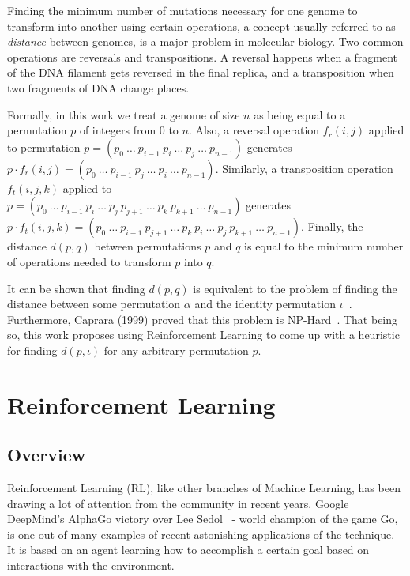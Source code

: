 \documentclass[11pt,twoside]{article}
\begin{document}
Finding the minimum number of mutations necessary for one genome to transform into another using certain operations, a concept usually referred to as \textit{distance} between genomes, is a major problem in molecular biology. Two common operations are reversals and transpositions. A reversal happens when a fragment of the DNA filament gets reversed in the final replica, and a transposition when two fragments of DNA change places. 

Formally, in this work we treat a genome of size $n$ as being equal to a permutation $p$ of integers from $0$ to $n$. Also, a reversal operation $f_r(i,j)$ applied to permutation $p = (p_0\ \ldots\ p_{i-1}\ p_{i}\ \ldots\ p_{j}\ \ldots\ p_{n-1})$ generates $p \cdot f_r(i,j) = (p_0\ \ldots\ p_{i-1}\ p_{j}\ \ldots\ p_{i}\ \ldots\ p_{n-1})$. Similarly, a transposition operation $f_t(i,j,k)$ applied to\\ $p = (p_0\ \ldots\ p_{i-1}\ p_{i}\ \ldots\ p_{j}\ p_{j+1}\ \ldots\ p_{k}\ p_{k+1}\ \ldots\ p_{n-1})$ generates\\ $p \cdot f_t(i,j,k) = (p_0\ \ldots\ p_{i-1}\ p_{j+1}\ \ldots\ p_{k}\ p_{i}\ \ldots\ p_{j}\ p_{k+1}\ \ldots\ p_{n-1})$. Finally, the distance $d(p, q)$ between permutations $p$ and $q$ is equal to the minimum number of operations needed to transform $p$ into $q$.

It can be shown that finding $d(p, q)$ is equivalent to the problem of finding the distance between some permutation $\alpha$ and the identity permutation $\iota$~\cite{flavio}. Furthermore, Caprara (1999) proved that this problem is NP-Hard~\cite{caprara1999sorting}. That being so, this work proposes using Reinforcement Learning to come up with a heuristic for finding $d(p, \iota)$ for any arbitrary permutation $p$.

\section{Reinforcement Learning}

\subsection{Overview}

Reinforcement Learning (RL), like other branches of Machine Learning, has been drawing a lot of attention from the community in recent years. Google DeepMind's AlphaGo victory over Lee Sedol~\cite{googlelee} - world champion of the game Go, is one out of many examples of recent astonishing applications of the technique. It is based on an agent learning how to accomplish a certain goal based on interactions with the environment.
\end{document}
